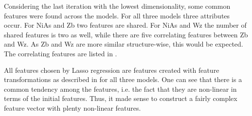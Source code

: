 Considering the last iteration with the lowest dimensionality, some common features were found across the models. For all three models three attributes occur. For NiAs and Zb two features are shared. For NiAs and Wz the number of shared features is two as well, while there are five correlating features between Zb and Wz. As Zb and Wz are more similar structure-wise, this would be expected. The correlating features are listed in .

All features chosen by Lasso regression are features created with feature transformations as described in  for all three models. One can see that there is a common tendency among the features, i.e. the fact that they are non-linear in terms of the initial features. Thus, it made sense to construct a fairly complex feature vector with plenty non-linear features. 





